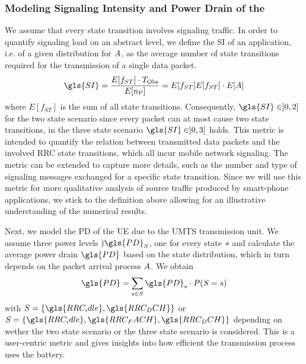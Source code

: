 \subsubsection*{Modeling Signaling Intensity and Power Drain of the }\label{sec:network:performance_model:system_description:metrics}

\newcommand{\fStateTransitions}{E[f_{ST}]}

We assume that every state transition involves signaling traffic.
In order to quantify signaling load on an abstract level, we define the \gls{SI} of an application, i.e. of a given distribution for \(A\), as the average number of state transitions required for the transmission of a single data packet.
\begin{equation}
\gls{SI} = \frac{\fStateTransitions \cdot \ObservationInterval}{E[\NObservedPackets]}\\
= \fStateTransitions {E[f_{ST}] }\cdot E[\PacketIAT]
\label{eq::sigIntensity}
\end{equation}
where \(\fStateTransitions\) is the sum of all state transitions.
Consequently, \(\gls{SI} \in ]0,2]\) for the two state scenario since every packet can at most cause two state transitions, in the three state scenario \(\gls{SI} \in]0,3]\) holds.
This metric is intended to quantify the relation between transmitted data packets and the involved \gls{RRC} state transitions, which all incur mobile network signaling.
The metric can be extended to capture more details, such as the number and type of signaling messages exchanged for a specific state transition.
Since we will use this metric for more qualitative analysis of source traffic produced by smart-phone applications, we stick to the definition above allowing for an illustrative understanding of the numerical results.

Next, we model the \gls{PD} of the \gls{UE} due to the \gls{UMTS} transmission unit. 
We assume three power levels \()\gls{PD}_{\RRCState}\), one for every state \(s\) and calculate the average power drain \(\gls{PD}\) based on the state distribution, which in turn depends on the packet arrival process \(A\).
We obtain
\begin{equation}
\gls{PD} = \sum_{\RRCStateRealization\in\RRCState} \gls{PD}_{\RRCStateRealization} \cdot P(\RRCState=\RRCStateRealization)
\label{eq::powerdrain}
\end{equation}
with \(\RRCState = \{\gls{RRC_idle},\gls{RRC_DCH}\}\) or \(\RRCState = \{\gls{RRC_idle},\gls{RRC_FACH},\gls{RRC_DCH}\}\) depending on wether the two state scenario or the three state scenario is considered.
This is a user-centric metric and gives insights into how efficient the transmission process uses the battery. 